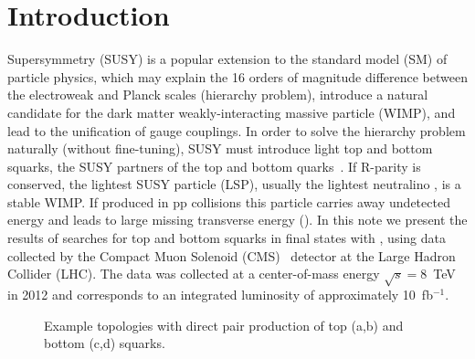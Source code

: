 \section{Introduction}
\label{sec:intro}

Supersymmetry (SUSY) is a popular extension to the standard model (SM) of particle physics, which may explain
the 16 orders of magnitude difference between the electroweak and Planck scales (hierarchy problem), introduce
a natural candidate for the dark matter weakly-interacting massive particle (WIMP), and lead to the unification of
gauge couplings.
In order to solve the hierarchy problem naturally (without fine-tuning), SUSY must introduce
light top and bottom squarks, the SUSY partners of the top and bottom quarks~\cite{ref:naturalsusy}.
If R-parity is conserved, the lightest SUSY particle (LSP),
usually the lightest neutralino \lsp, is a stable WIMP. If produced in pp collisions this
particle carries away undetected energy and leads to large missing transverse energy (\met).
In this note we present the results of searches for top and bottom squarks in final states with \met, 
using data collected by the Compact Muon Solenoid (CMS)~\cite{ref:CMS} detector at the
Large Hadron Collider (LHC). The data was collected at a center-of-mass energy $\sqrt{s}=8$~TeV in 2012
and corresponds to an integrated luminosity of approximately 10~fb$^{-1}$.

\begin{figure}
\begin{center}
\quad
{}\quad
{}
\caption{Example topologies with direct pair production of top (a,b) and bottom (c,d) squarks.
\label{fig:diagrams}
}
\end{center}
\end{figure}


